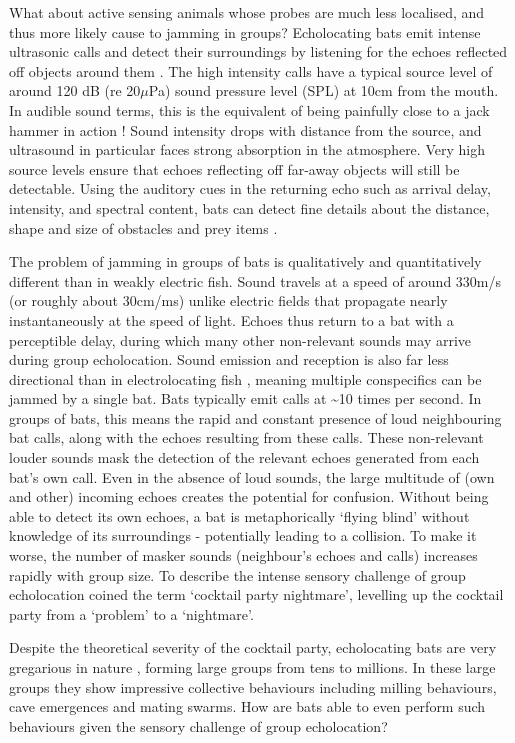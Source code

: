 \documentclass[
]{book}
\begin{document}
What about active sensing animals whose probes are much less localised, and thus more likely cause to jamming in groups? Echolocating bats emit intense ultrasonic calls and detect their surroundings by listening for the echoes reflected off objects around them \citep{griffingalambos1941}. The high intensity calls have a typical source level of around 120 dB (re 20\(\mu\)Pa) sound pressure level (SPL) at 10cm from the mouth. In audible sound terms, this is the equivalent of being painfully close to a jack hammer in action \citep{ashawebpage}! Sound intensity drops with distance from the source, and ultrasound in particular faces strong absorption in the atmosphere. Very high source levels ensure that echoes reflecting off far-away objects will still be detectable. Using the auditory cues in the returning echo such as arrival delay, intensity, and spectral content, bats can detect fine details about the distance, shape and size of obstacles and prey items \citep{Simmons2014}.

The problem of jamming in groups of bats is qualitatively and quantitatively different than in weakly electric fish. Sound travels at a speed of around 330m/s (or roughly about 30cm/ms) unlike electric fields that propagate nearly instantaneously at the speed of light. Echoes thus return to a bat with a perceptible delay, during which many other non-relevant sounds may arrive during group echolocation. Sound emission and reception is also far less directional than in electrolocating fish \citep{nelson2006a}, meaning multiple conspecifics can be jammed by a single bat. Bats typically emit calls at \textasciitilde10 times per second. In groups of bats, this means the rapid and constant presence of loud neighbouring bat calls, along with the echoes resulting from these calls. These non-relevant louder sounds mask the detection of the relevant echoes generated from each bat's own call. Even in the absence of loud sounds, the large multitude of (own and other) incoming echoes creates the potential for confusion. Without being able to detect its own echoes, a bat is metaphorically `flying blind' without knowledge of its surroundings - potentially leading to a collision. To make it worse, the number of masker sounds (neighbour's echoes and calls) increases rapidly with group size. To describe the intense sensory challenge of group echolocation \citet{ulanovsky2008a} coined the term `cocktail party nightmare', levelling up the cocktail party from a `problem' to a `nightmare'.

Despite the theoretical severity of the cocktail party, echolocating bats are very gregarious in nature \citep{ortega2016a}, forming large groups from tens to millions. In these large groups they show impressive collective behaviours including milling behaviours, cave emergences and mating swarms. How are bats able to even perform such behaviours given the sensory challenge of group echolocation?
\end{document}
